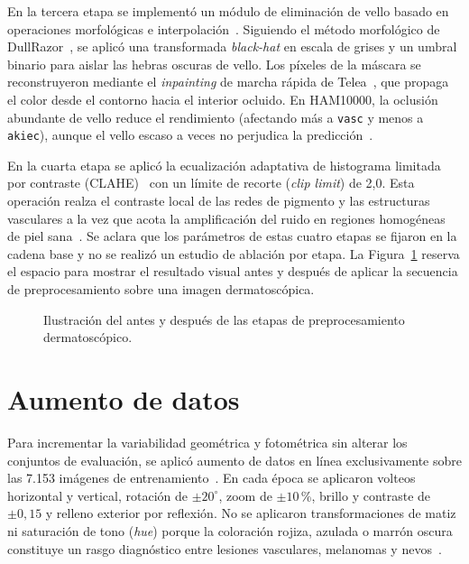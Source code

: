 En la tercera etapa se implementó un módulo de eliminación de vello basado en operaciones morfológicas e interpolación~\cite{lee1997dullrazor,telea2004inpainting}. Siguiendo el método morfológico de DullRazor~\cite{lee1997dullrazor}, se aplicó una transformada \textit{black-hat} en escala de grises y un umbral binario para aislar las hebras oscuras de vello. Los píxeles de la máscara se reconstruyeron mediante el \textit{inpainting} de marcha rápida de Telea~\cite{telea2004inpainting}, que propaga el color desde el contorno hacia el interior ocluido. En HAM10000, la oclusión abundante de vello reduce el rendimiento (afectando más a \texttt{vasc} y menos a \texttt{akiec}), aunque el vello escaso a veces no perjudica la predicción~\cite{wang2024hair}.

En la cuarta etapa se aplicó la ecualización adaptativa de histograma limitada por contraste (CLAHE)~\cite{zuiderveld1994clahe} con un límite de recorte (\textit{clip limit}) de 2,0. Esta operación realza el contraste local de las redes de pigmento y las estructuras vasculares a la vez que acota la amplificación del ruido en regiones homogéneas de piel sana~\cite{zuiderveld1994clahe}. Se aclara que los parámetros de estas cuatro etapas se fijaron en la cadena base y no se realizó un estudio de ablación por etapa. La Figura~\ref{fig:preprocesamiento} reserva el espacio para mostrar el resultado visual antes y después de aplicar la secuencia de preprocesamiento sobre una imagen dermatoscópica.

\begin{figure}[H]
  \centering
  \caption{Ilustración del antes y después de las etapas de preprocesamiento dermatoscópico.}
  \label{fig:preprocesamiento}
\end{figure}

\section{Aumento de datos}

Para incrementar la variabilidad geométrica y fotométrica sin alterar los conjuntos de evaluación, se aplicó aumento de datos en línea exclusivamente sobre las 7.153 imágenes de entrenamiento~\cite{zhang2024dive}. En cada época se aplicaron volteos horizontal y vertical, rotación de $\pm 20^\circ$, zoom de $\pm 10$\,\%, brillo y contraste de $\pm 0{,}15$ y relleno exterior por reflexión. No se aplicaron transformaciones de matiz ni saturación de tono (\textit{hue}) porque la coloración rojiza, azulada o marrón oscura constituye un rasgo diagnóstico entre lesiones vasculares, melanomas y nevos~\cite{tschandl2018ham10000}.

